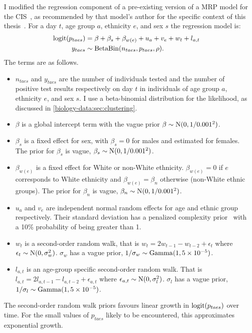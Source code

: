 \documentclass[thesis.tex]{subfiles}
\begin{document}
I modified the regression component of a pre-existing version of a MRP model for the CIS~\autocite{pouwelsMRPvaccination}, as recommended by that model's author for the specific context of this thesis~.
For a day $t$, age group $a$, ethnicity $e$, and sex $s$ the regression model is:
\begin{align}
    \operatorname{logit}(p_{taes}) &= \beta + \beta_s + \beta_{w(e)} + u_a + v_e + w_t + l_{a,t} \\
    y_{taes} &\sim \operatorname{BetaBin}(n_{taes}, p_{taes}, \rho).
\end{align}
The terms are as follows.
\begin{itemize}
    \item $n_{taes}$ and $y_{taes}$ are the number of individuals tested and the number of positive test results respectively on day $t$ in individuals of age group $a$, ethnicity $e$, and sex $s$. I use a beta-binomial distribution for the likelihood, as discussed in \cref{biology-data:sec:clustering}.
    \item $\beta$ is a global intercept term with the vague prior $\beta \sim \operatorname{N}(0, 1/0.001^2)$.
    \item $\beta_s$ is a fixed effect for sex, with $\beta_s = 0$ for males and estimated for females. The prior for $\beta_s$ is vague, $\beta_s \sim \operatorname{N}(0, 1/0.001^2)$.
    \item $\beta_{w(e)}$ is a fixed effect for White or non-White ethnicity. $\beta_{w(e)} = 0$ if $e$ corresponds to White ethnicity and $\beta_{w(e)} = \beta_{n}$ otherwise (\ie non-White ethnic groups).
      The prior for $\beta_n$ is vague, $\beta_n \sim \operatorname{N}(0, 1/0.001^2)$.
    \item $u_a$ and $v_e$ are independent normal random effects for age and ethnic group respectively. Their standard deviation has a penalized complexity prior~\autocite{simpsonPenalising} with a 10\% probability of being greater than 1.
    \item $w_t$ is a second-order random walk, that is $w_t = 2w_{t-1} - w_{t-2} + \epsilon_t$ where $\epsilon_t \sim \operatorname{N}(0, \sigma_w^2)$.
      $\sigma_w$ has a vague prior, $1/\sigma_w \sim \operatorname{Gamma}(1, 5 \times 10^{-5})$.
    \item $l_{a,t}$ is an age-group specific second-order random walk.
      That is $l_{a,t} = 2l_{a,t-1} - l_{a,t-2} + \epsilon_{a,t}$ where $\epsilon_{a,t} \sim \operatorname{N}(0, \sigma_l^2)$.
      $\sigma_l$ has a vague prior, $1/\sigma_l \sim \operatorname{Gamma}(1, 5 \times 10^{-5})$.
\end{itemize}
The second-order random walk priors favours linear growth in $\operatorname{logit}(p_{taes})$ over time.
For the small values of $p_{taes}$ likely to be encountered, this approximates exponential growth.
\end{document}
